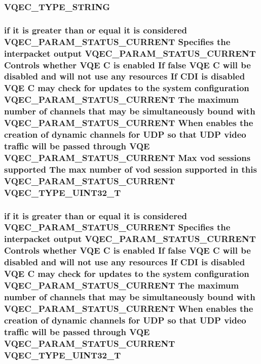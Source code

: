 \subsubsection{\setlength{\rightskip}{0pt plus 5cm}\bf{VQEC\_\-TYPE\_\-STRING}}\label{vqec__cfg__settings_8h_b8ff95b4d9e7c8fe29be1429aaa7322b}


\subsubsection{\setlength{\rightskip}{0pt plus 5cm}if it is greater than or equal it is considered VQEC\_\-PARAM\_\-STATUS\_\-CURRENT Specifies the interpacket output VQEC\_\-PARAM\_\-STATUS\_\-CURRENT Controls whether VQE \bf{C} is enabled If false VQE \bf{C} will be disabled and will not use any resources If CDI is disabled VQE \bf{C} may check for updates \bf{to} the system configuration VQEC\_\-PARAM\_\-STATUS\_\-CURRENT The maximum number of \bf{channels} that may be simultaneously bound with VQEC\_\-PARAM\_\-STATUS\_\-CURRENT When enables the creation of dynamic \bf{channels} for UDP so that UDP video traffic will be passed through VQE VQEC\_\-PARAM\_\-STATUS\_\-CURRENT Max vod sessions supported The max number of vod session supported in \bf{this} VQEC\_\-PARAM\_\-STATUS\_\-CURRENT \bf{VQEC\_\-TYPE\_\-UINT32\_\-T}}\label{vqec__cfg__settings_8h_a8cdf5bed5236a8a2561c109ac0ac209}


\subsubsection{\setlength{\rightskip}{0pt plus 5cm}if it is greater than or equal it is considered VQEC\_\-PARAM\_\-STATUS\_\-CURRENT Specifies the interpacket output VQEC\_\-PARAM\_\-STATUS\_\-CURRENT Controls whether VQE \bf{C} is enabled If false VQE \bf{C} will be disabled and will not use any resources If CDI is disabled VQE \bf{C} may check for updates \bf{to} the system configuration VQEC\_\-PARAM\_\-STATUS\_\-CURRENT The maximum number of \bf{channels} that may be simultaneously bound with VQEC\_\-PARAM\_\-STATUS\_\-CURRENT When enables the creation of dynamic \bf{channels} for UDP so that UDP video traffic will be passed through VQE VQEC\_\-PARAM\_\-STATUS\_\-CURRENT \bf{VQEC\_\-TYPE\_\-UINT32\_\-T}}\label{vqec__cfg__settings_8h_f3e76e06276df066ce9808b18929cdd6}



